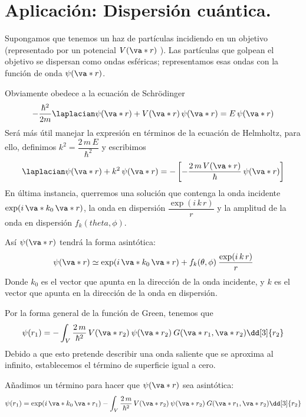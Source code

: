 \section{Aplicación: Dispersión cuántica.}
Supongamos que tenemos un haz de partículas incidiendo en un objetivo (representado por un potencial $V(\va*{r})$ ). Las partículas que golpean el objetivo se dispersan como ondas esféricas; representamos esas ondas con la función de onda $\psi(\va*{r})$. 
\par
Obviamente obedece a la ecuación de Schrödinger
\begin{equation}
- \dfrac{\hbar^{2}}{2m} \laplacian \psi (\va*{r}) + V (\va*{r}) \, \psi (\va*{r}) =  E \, \psi (\va*{r})
\label{eq:ecuacion_44} 
\end{equation}
Será más útil manejar la expresión en términos de la ecuación de Helmholtz, para ello, definimos $\displaystyle k^{2} = \dfrac{2 \, m \, E}{\hbar^{2}}$ y escribimos
\begin{equation}
\laplacian \psi (\va*{r}) + k^{2} \, \psi (\va*{r}) = - \left[ - \dfrac{2 \, m \, V (\va*{r})}{\hbar} \, \psi (\va*{r})\right]
\label{eq:ecuacion_45}
\end{equation}
En última instancia, querremos una solución que contenga la onda incidente $\exp(i \, \va*{k}_{0} \, \va*{r})$, la onda en dispersión $\displaystyle \dfrac{\exp(i \, k \, r)}{r}$ y la amplitud de la onda en dispersión $f_{k} (theta, \phi)$.
\par
Así $\psi (\va*{r})$ tendrá la forma asintótica:
\begin{equation}
\psi (\va*{r}) \simeq \exp(i \, \va*{k}_{0} \, \va*{r}) + f_{k} (\theta, \phi) \: \dfrac{\exp(i \, k \, r)}{r}
\label{eq:ecuacion_46}
\end{equation}
Donde $k_{0}$ es el vector que apunta en la dirección de la onda incidente, y $k$ es el vector que apunta en la dirección de la onda en dispersión.
\par
Por la forma general de la función de Green, tenemos que
\begin{equation}
\psi(r_{1}) = - \int_{V} \dfrac{2 \, m}{\hbar^{2}} \, V(\va*{r}_{2}) \: \psi (\va*{r}_{2}) \: G (\va*{r}_{1}, \va*{r}_{2}) \dd[3]{r_{2}}
\label{eq:ecuacion_47}
\end{equation}
Debido a que esto pretende describir una onda saliente que se aproxima al infinito, establecemos el término de superficie igual a cero. 
\par
Añadimos un término para hacer que $\psi (\va*{r})$ sea asintótica:
\begin{equation}
\psi(r_{1}) = \exp(i \, \va*{k}_{0} \, \va*{r}_{1}) - \int_{V} \dfrac{2 \, m}{\hbar^{2}} \, V(\va*{r}_{2}) \: \psi (\va*{r}_{2}) \: G (\va*{r}_{1}, \va*{r}_{2}) \dd[3]{r_{2}}
\label{eq:ecuacion_48}
\end{equation}
